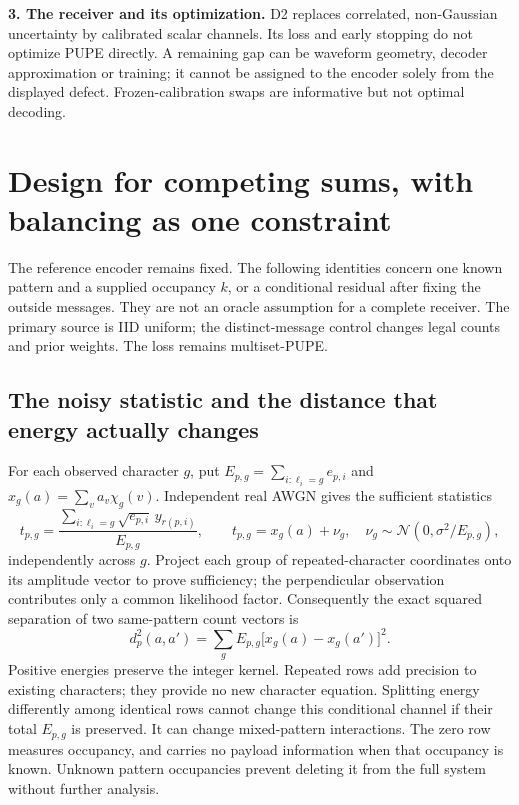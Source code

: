 \documentclass[10pt,a4paper]{article}
\begin{document}
\textbf{3. The receiver and its optimization.}
D2 replaces correlated, non-Gaussian uncertainty by calibrated scalar channels. Its loss and early stopping do not
optimize PUPE directly. A remaining gap can be waveform geometry, decoder approximation or training; it cannot be
assigned to the encoder solely from the displayed defect. Frozen-calibration swaps are informative but not optimal decoding.

\clearpage
\section{Design for competing sums, with balancing as one constraint}
\label{sec:sum-design}
The reference encoder remains fixed. The following identities concern one known pattern and a supplied
occupancy $k$, or a conditional residual after fixing the outside messages. They are not an oracle assumption
for a complete receiver. The primary source is IID uniform; the distinct-message control changes legal counts
and prior weights. The loss remains multiset-PUPE.

\subsection{The noisy statistic and the distance that energy actually changes}
For each observed character $g$, put $E_{p,g}=\sum_{i:\ell_i=g}e_{p,i}$ and
$x_g(a)=\sum_v a_v\chi_g(v)$. Independent real AWGN gives the sufficient statistics
\begin{equation}
 t_{p,g}=\frac{\sum_{i:\ell_i=g}\sqrt{e_{p,i}}\,y_{r(p,i)}}{E_{p,g}},\qquad
 t_{p,g}=x_g(a)+\nu_g,\quad \nu_g\sim\mathcal N(0,\sigma^2/E_{p,g}),
 \label{eq:character-statistic}
\end{equation}
independently across $g$. Project each group of repeated-character coordinates onto its amplitude vector
to prove sufficiency; the perpendicular observation contributes only a common likelihood factor.
Consequently the exact squared separation of two same-pattern count vectors is
\begin{equation}
 d_p^2(a,a')=\sum_g E_{p,g}\big[x_g(a)-x_g(a')\big]^2.
 \label{eq:character-distance}
\end{equation}
Positive energies preserve the integer kernel. Repeated rows add precision to existing characters;
they provide no new character equation. Splitting energy differently among identical rows cannot change
this conditional channel if their total $E_{p,g}$ is preserved. It can change mixed-pattern interactions.
The zero row measures occupancy, and carries no payload information when that occupancy is known.
Unknown pattern occupancies prevent deleting it from the full system without further analysis.
\end{document}
